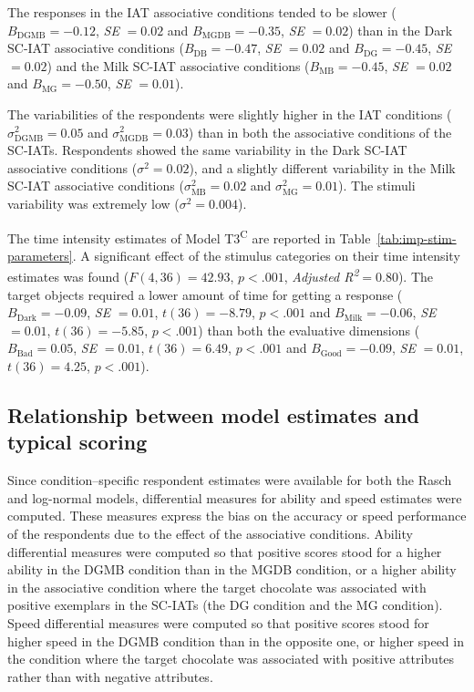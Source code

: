 \documentclass[12pt]{book}
\begin{document}
The responses in the IAT associative conditions tended to be slower ($B_{\text{DGMB}} = -0.12$, \emph{SE}  $= 0.02$ and $B_{\text{MGDB}} = -0.35$, \emph{SE}  $= 0.02$) than in the Dark SC-IAT associative conditions ($B_{\text{DB}} = -0.47$, \emph{SE}  $= 0.02$ and $B_{\text{DG}} = -0.45$, \emph{SE}  $= 0.02$) and the Milk SC-IAT associative conditions ($B_{\text{MB}} = -0.45$, \emph{SE}  $= 0.02$ and $B_{\text{MG}} = -0.50$, \emph{SE}  $= 0.01$).

The variabilities of the respondents were slightly higher in the IAT conditions ($\sigma_{\text{DGMB}}^ 2 = 0.05$ and $\sigma_{\text{MGDB}}^2 = 0.03$) than in both the associative conditions of the SC-IATs. 
Respondents showed the same variability in the Dark SC-IAT associative conditions ($\sigma^2 = 0.02$), and a slightly different variability in the Milk SC-IAT associative conditions ($\sigma_{\text{MB}}^2 = 0.02$ and $\sigma_{\text{MG}}^2 = 0.01$). 
The stimuli variability was extremely low ($\sigma^2 = 0.004$).

The time intensity estimates of Model T3\textsuperscript{C} are reported in Table~\ref{tab:imp-stim-parameters}.  
A significant effect of the stimulus categories on their time intensity estimates was found ($F(4,36)= 42.93$, $p < .001$, \emph{Adjusted R\textsuperscript{2}}$= 0.80$). 
	The target objects required a lower amount of time for getting a response ($B_{\text{Dark}} = -0.09$, \emph{SE}  $= 0.01$, $t(36) = -8.79$, $p < .001$ and $B_{\text{Milk}} = -0.06$, \emph{SE}  $= 0.01$, $t(36) = -5.85$, $p < .001$) than both the evaluative dimensions  ($B_{\text{Bad}} = 0.05$, \emph{SE}  $= 0.01$, $t(36) = 6.49$, $p < .001$ and $B_{\text{Good}} = -0.09$, \emph{SE}  $= 0.01$, $t(36) = 4.25$, $p < .001$).


\subsection{Relationship between model estimates and typical scoring}

Since condition--specific respondent estimates were available for both the Rasch and log-normal models, differential measures for ability and speed estimates were computed.
These measures express the bias on the accuracy or speed performance of the respondents due to the effect of the associative conditions. 
Ability differential measures were computed so that positive scores stood for a higher ability in the DGMB condition than in the MGDB condition, or a higher ability in the associative condition where the target chocolate was associated with positive exemplars in the SC-IATs (the DG condition and the MG condition). 
Speed differential measures were computed so that positive scores stood for higher speed in the DGMB condition than in the opposite one, or  higher speed in the condition where the target chocolate was associated with positive attributes rather than with negative attributes.
\end{document}
